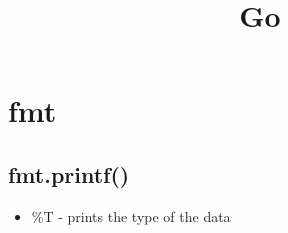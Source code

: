 \documentclass[]{article}
\title{Go}
\author{}
\begin{document}
\maketitle

\begin{abstract}

\end{abstract}

\section{fmt}
\subsection{fmt.printf()}
\begin{itemize}
	\item \%T - prints the type of the data 
\end{itemize}
\end{document}
